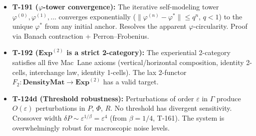\begin{itemize}[leftmargin=2em,nosep]
        All five axioms A1--A5 are \emph{theorems} derivable from (AP)+(PH)+(QG)+(V)+MaxEnt:
        A1 via T-76+T-186, A2 via T-187+T-189, A3 via Theorem~S+T15, A4 from (AP) necessity,
        A5 via T-87. UHM is \textbf{self-grounding}: zero independent axioms beyond the
        defining conditions of viable holons.
  \item \textbf{T-191  ($\varphi$-tower convergence):}
        The iterative self-modeling tower $\varphi^{(0)}, \varphi^{(1)}, \ldots$ converges
        exponentially ($\|\varphi^{(n)} - \varphi^*\| \leq q^n$, $q < 1$) to the unique
        $\varphi^*$ from any initial anchor. Resolves the apparent $\varphi$-circularity.
        Proof via Banach contraction + Perron--Frobenius.
  \item \textbf{T-192  ($\mathbf{Exp}^{(2)}$ is a strict 2-category):}
        The experiential 2-category satisfies all five Mac~Lane axioms (vertical/horizontal
        composition, identity 2-cells, interchange law, identity 1-cells). The lax 2-functor
        $F_2: \mathbf{DensityMat} \to \mathbf{Exp}^{(2)}$ has a valid target.
  \item \textbf{T-124d  (Threshold robustness):}
        Perturbations of order $\varepsilon$ in $\Gamma$ produce $O(\varepsilon)$
        perturbations in $P$, $\Phi$, $R$. No threshold has divergent sensitivity.
        Crossover width $\delta P \sim \varepsilon^{1/\beta} = \varepsilon^4$ (from
        $\beta = 1/4$, T-161). The system is overwhelmingly robust for macroscopic noise
        levels.
\end{itemize}

